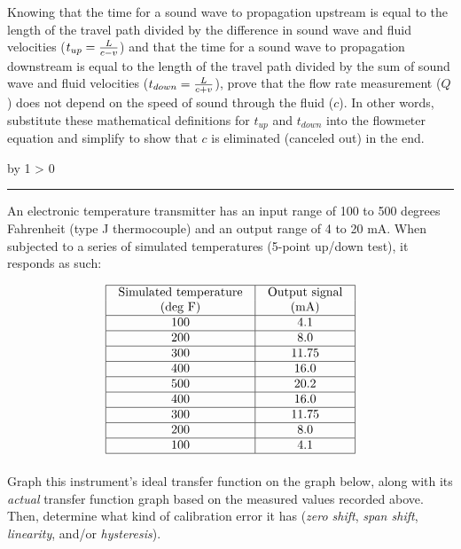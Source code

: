 \documentclass[12pt,a4paper]{article}
\def\oppgave{
            \advance\questnum by 1
            \ifnum \questnum > 0
                 \hrule
                 \vskip 3pt
                 \leftline{Oppgave \the\questnum}
                 \vskip 3pt \fi}
\begin{document}
Knowing that the time for a sound wave to propagation upstream is equal to the length of the travel path divided by the difference in sound wave and fluid velocities ($t_{up} = {L \over {c - v}}$) and that the time for a sound wave to propagation downstream is equal to the length of the travel path divided by the sum of sound wave and fluid velocities ($t_{down} = {L \over {c + v}}$), prove that the flow rate measurement ($Q$) does not depend on the speed of sound through the fluid ($c$).  In other words, substitute these mathematical definitions for $t_{up}$ and $t_{down}$ into the flowmeter equation and simplify to show that $c$ is eliminated (canceled out) in the end.

\vfil 

\eject
\vskip 10pt \filbreak 
\oppgave{} 

An electronic temperature transmitter has an input range of 100 to 500 degrees Fahrenheit (type J thermocouple) and an output range of 4 to 20 mA.  When subjected to a series of simulated temperatures (5-point up/down test), it responds as such:


$$\vbox{\offinterlineskip
\halign{\strut
\vrule \quad\hfil # \ \hfil & 
\vrule \quad\hfil # \ \hfil \vrule \cr
\noalign{\hrule}
%
Simulated temperature & Output signal \cr
%
(deg F) & (mA) \cr
%
\noalign{\hrule}
%
100 & 4.1 \cr
%
\noalign{\hrule}
%
200 & 8.0 \cr
%
\noalign{\hrule}
%
300 & 11.75 \cr
%
\noalign{\hrule}
%
400 & 16.0 \cr
%
\noalign{\hrule}
%
500 & 20.2 \cr
%
\noalign{\hrule}
%
400 & 16.0 \cr
%
\noalign{\hrule}
%
300 & 11.75 \cr
%
\noalign{\hrule}
%
200 & 8.0 \cr
%
\noalign{\hrule}
%
100 & 4.1 \cr
%
\noalign{\hrule}
} %
}$$ %

Graph this instrument's ideal transfer function on the graph below, along with its {\it actual} transfer function graph based on the measured values recorded above.  Then, determine what kind of calibration error it has ({\it zero shift}, {\it span shift}, {\it linearity}, and/or {\it hysteresis}).
\end{document}
